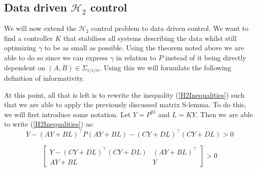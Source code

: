 


\subsection{Data driven $\mathcal{H}_2$ control}
We will now extend the $\mathcal{H}_2$ control problem to data driven control. We want to find a controller $K$ that stabilises all systems describing the data whilst still optimizing $\gamma$ to be as small as possible. Using the theorem noted above we are able to do so since we can express $\gamma$ in relation to $P$ instead of it being directly dependent on $(A,B) \in \Sigma_{i/s/n}$. Using this we will formulate the following definition of informativity.


At this point, all that is left is to rewrite the inequality (\ref{H2Inequalities}) such that we are able to apply the previously discussed matrix S-lemma. To do this, we will first introduce some notation. Let $Y = P^{01}$ and $L = KY$. Then we are able to write (\ref{H2Inequalities}) as:
\begin{equation*}
	Y - (AY + BL)^\top P (AY + BL) - (CY + DL)^\top (CY+DL) > 0
\end{equation*}


\begin{equation} \label{H2AfterSchur}
	\begin{bmatrix} Y - (CY + DL)^\top(CY + DL) & (AY + BL)^\top \\ AY + BL & Y \end{bmatrix} > 0
\end{equation}

